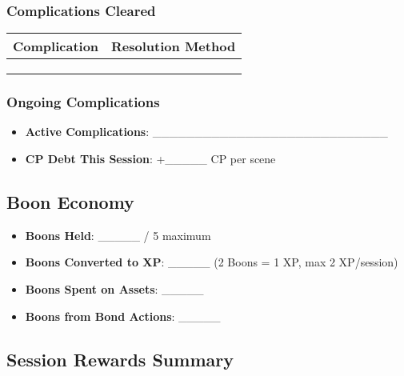 \subsubsection{Complications Cleared}
\begin{tabular}{|p{5cm}|p{5cm}|}
\hline
\textbf{Complication} & \textbf{Resolution Method} \\
\hline
& \\
& \\
& \\
\hline
\end{tabular}

\subsubsection{Ongoing Complications}
\begin{itemize}
    \item \textbf{Active Complications}: \_\_\_\_\_\_\_\_\_\_\_\_\_\_\_\_\_\_\_\_\_\_\_\_\_\_\_\_
    \item \textbf{CP Debt This Session}: +\_\_\_\_\_ CP per scene
\end{itemize}

\subsection{Boon Economy}

\begin{itemize}
    \item \textbf{Boons Held}: \_\_\_\_\_ / 5 maximum
    \item \textbf{Boons Converted to XP}: \_\_\_\_\_ (2 Boons = 1 XP, max 2 XP/session)
    \item \textbf{Boons Spent on Assets}: \_\_\_\_\_
    \item \textbf{Boons from Bond Actions}: \_\_\_\_\_
\end{itemize}

\subsection{Session Rewards Summary}

